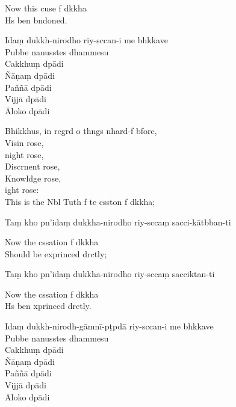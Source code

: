 \begin{english}
  Now this cuse f dkkha\\
  Hs ben bndoned.
\end{english}

Idaṃ dukkh-nirodho riy-sccan-i me bhkkave\\
Pubbe nanusstes dhammesu\\
Cakkhuṃ dpādi\\
Ñāṇaṃ dpādi\\
Paññā dpādi\\
Vijjā dpādi\\
Āloko dpādi

\begin{english}
  Bhikkhus, in regrd o thngs nhard-f bfore,\\
  Visin rose,\\
  night rose,\\
  Discrnent rose,\\
  Knowldge rose,\\
  ight rose:\\
  This is the Nbl Tuth f te csston f dkkha;
\end{english}

Taṃ kho pn'idaṃ dukkha-nirodho riy-sccaṃ sacci-kātbban-ti

\begin{english}
  Now the cssation f dkkha\\
  Should be exprinced drctly;
\end{english}

Taṃ kho pn'idaṃ dukkha-nirodho riy-sccaṃ sacciktan-ti

\begin{english}
  Now the cssation f dkkha\\
  Hs ben xprinced drctly.
\end{english}

Idaṃ dukkh-nirodh-gāmnī-pṭpdā riy-sccan-i me bhkkave\\
Pubbe nanusstes dhammesu\\
Cakkhuṃ dpādi\\
Ñāṇaṃ dpādi\\
Paññā dpādi\\
Vijjā dpādi\\
Āloko dpādi

